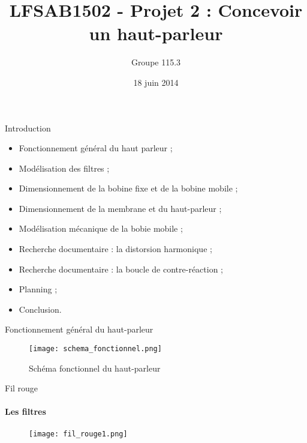 \documentclass[pdf]{beamer}
\title{LFSAB1502 - Projet 2 : Concevoir un haut-parleur}
\author{Groupe 115.3}
\date{18 juin 2014}
\begin{document}
\begin{frame}
\titlepage
\end{frame}

\begin{frame}{Introduction}
	\begin{itemize}
		\item Fonctionnement général du haut parleur ;
		\item Modélisation des filtres ;
 		\item Dimensionnement de la bobine fixe et de la bobine
 		mobile ;
 		\item Dimensionnement de la membrane et du haut-parleur ;
 		\item Modélisation mécanique de la bobie mobile ;
		\item Recherche documentaire : la distorsion harmonique ;
		\item Recherche documentaire : la boucle de contre-réaction ;
 		\item Planning ;
 		\item Conclusion.
	\end{itemize}
\end{frame}

\begin{frame}{Fonctionnement général du haut-parleur}
\begin{figure}[ht!]
    \centering
    \texttt{[image: schema\_fonctionnel.png]}
    \caption{Schéma fonctionnel du haut-parleur}
    \label{schema_fonctionnel}
\end{figure}
\end{frame}

\begin{frame}{Fil rouge}
\framesubtitle{Les filtres}
\begin{figure}[ht!]
    \centering
    \texttt{[image: fil\_rouge1.png]}
\end{figure}
\end{frame}
\end{document}
